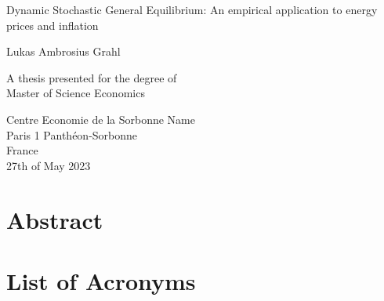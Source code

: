 \documentclass[12pt,a4paper,english]{article} %
\let\oldsection\section
\renewcommand\section{\clearpage\oldsection}
\begin{document}
	
	
	\begin{titlepage}
		\begin{center}
			\vspace*{1cm}
			
			\Large
			Dynamic Stochastic General Equilibrium: An empirical application to energy prices and inflation
			
			
			\vspace{1.5cm}
			
			Lukas Ambrosius Grahl
			
			\vfill
			
			A thesis presented for the degree of\\
			Master of Science Economics
			
			\vspace{5 cm}
			
		\end{center}
		Centre Economie de la Sorbonne Name\\
		Paris 1 Panthéon-Sorbonne \\
		France\\
		27th of May 2023
		
			
			

	\end{titlepage}

	\pagebreak

	\section*{Abstract}
	\pagebreak

	
	\section*{List of Acronyms}
	\begin{acronym}
	\end{acronym}
	\listoffigures
	\listoftables
	\pagebreak
	
		
	\tableofcontents
	\pagebreak
	
\end{document}
